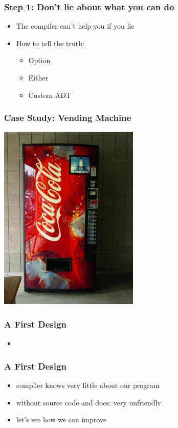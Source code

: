 \documentclass{beamer}
\begin{document}
\begin{frame}
  \frametitle{Step 1: Don't lie about what you can do}
  \begin{itemize}
  \item The compiler can't help you if you lie
  \item How to tell the truth:
    \begin{itemize}
    \item Option
    \item Either
    \item Custom ADT
    \end{itemize}
  \end{itemize}
\end{frame}

\begin{frame}
  \frametitle{Case Study: Vending Machine}
  \begin{center}
    \includegraphics[width=0.5\textwidth]{../pics/vending.jpg}
  \end{center}
\end{frame}

\begin{frame}
  \frametitle{A First Design}
  \begin{itemize}
  \item 
  \end{itemize}
\end{frame}

\begin{frame}
  \frametitle{A First Design}
  \begin{itemize}
  \item compiler knows very little about our program
  \item without source code and docs: very unfriendly
  \item let's see how we can improve
  \end{itemize}
\end{frame}
\end{document}
